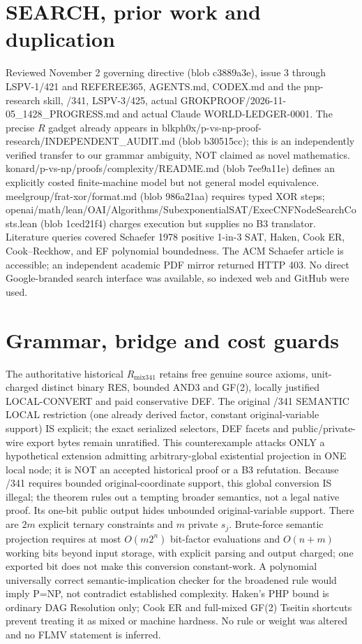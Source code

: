 \documentclass[11pt]{article}
\begin{document}
\section*{SEARCH, prior work and duplication}
\noindent Reviewed November 2 governing directive (blob c3889a3e), issue 3 through LSPV-1/421 and REFEREE365, AGENTS.md, CODEX.md and the pnp-research skill, /341, LSPV-3/425, actual GROKPROOF/2026-11-05\_1428\_PROGRESS.md and actual Claude WORLD-LEDGER-0001. The precise $R$ gadget already appears in blkph0x/p-vs-np-proof-research/INDEPENDENT\_AUDIT.md (blob b30515cc); this is an independently verified transfer to our grammar ambiguity, NOT claimed as novel mathematics. konard/p-vs-np/proofs/complexity/README.md (blob 7ee9a11e) defines an explicitly costed finite-machine model but not general model equivalence. meelgroup/frat-xor/format.md (blob 986a21aa) requires typed XOR steps; openai/math/lean/OAI/Algorithms/SubexponentialSAT/ExecCNFNodeSearchCosts.lean (blob 1ced21f4) charges execution but supplies no B3 translator. Literature queries covered Schaefer 1978 positive 1-in-3 SAT, Haken, Cook ER, Cook--Reckhow, and EF polynomial boundedness. The ACM Schaefer article is accessible; an independent academic PDF mirror returned HTTP 403. No direct Google-branded search interface was available, so indexed web and GitHub were used.
\section*{Grammar, bridge and cost guards}
\noindent The authoritative historical $R_{\mathrm{mix341}}$ retains free genuine source axioms, unit-charged distinct binary RES, bounded AND3 and GF(2), locally justified LOCAL-CONVERT and paid conservative DEF. The original /341 SEMANTIC LOCAL restriction (one already derived factor, constant original-variable support) IS explicit; the exact serialized selectors, DEF facets and public/private-wire export bytes remain unratified. This counterexample attacks ONLY a hypothetical extension admitting arbitrary-global existential projection in ONE local node; it is NOT an accepted historical proof or a B3 refutation. Because /341 requires bounded original-coordinate support, this global conversion IS illegal; the theorem rules out a tempting broader semantics, not a legal native proof. Its one-bit public output hides unbounded original-variable support.
\noindent There are $2m$ explicit ternary constraints and $m$ private $s_j$. Brute-force semantic projection requires at most $O(m2^n)$ bit-factor evaluations and $O(n+m)$ working bits beyond input storage, with explicit parsing and output charged; one exported bit does not make this conversion constant-work. A polynomial universally correct semantic-implication checker for the broadened rule would imply P=NP, not contradict established complexity. Haken's PHP bound is ordinary DAG Resolution only; Cook ER and full-mixed GF(2) Tseitin shortcuts prevent treating it as mixed or machine hardness. No rule or weight was altered and no FLMV statement is inferred.
\end{document}
